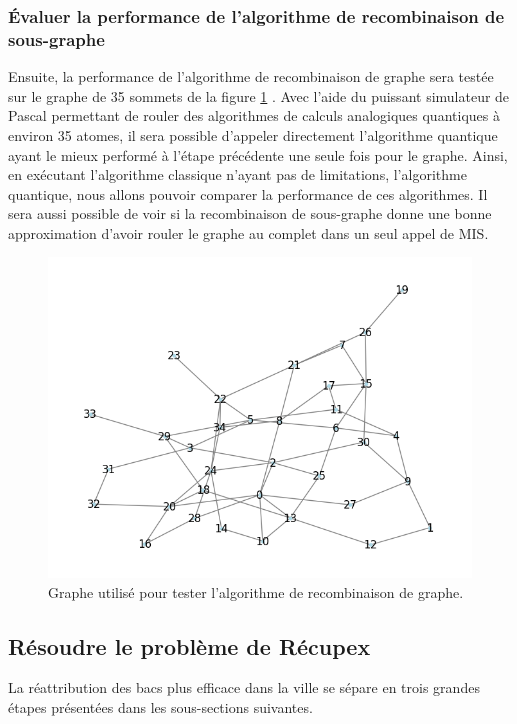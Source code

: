 \documentclass[11pt]{article}
\begin{document}
\subsubsection{Évaluer la performance de l'algorithme de recombinaison de sous-graphe}\label{indep}
Ensuite, la performance de l'algorithme de recombinaison de graphe sera testée sur le graphe de 35 sommets de la figure \ref{35atoms} . Avec l'aide du puissant simulateur de Pascal permettant de rouler des algorithmes de calculs analogiques quantiques à environ 35 atomes, il sera possible d'appeler directement l'algorithme quantique ayant le mieux performé à l'étape précédente une seule fois pour le graphe. Ainsi, en exécutant l'algorithme classique n'ayant pas de limitations, l'algorithme quantique, nous allons pouvoir comparer la performance de ces algorithmes. Il sera aussi possible de voir si la recombinaison de sous-graphe donne une bonne approximation d'avoir rouler le graphe au complet dans un seul appel de MIS.


\begin{figure}[H]
    \centering
    \includegraphics[width=0.49\linewidth]{images/35atomes.png}
    \caption{Graphe utilisé pour tester l'algorithme de recombinaison de graphe.}
    \label{35atoms}
\end{figure}

\subsection{Résoudre le problème de Récupex}
La réattribution des bacs plus efficace dans la ville se sépare en trois grandes étapes présentées dans les sous-sections suivantes.
\end{document}
